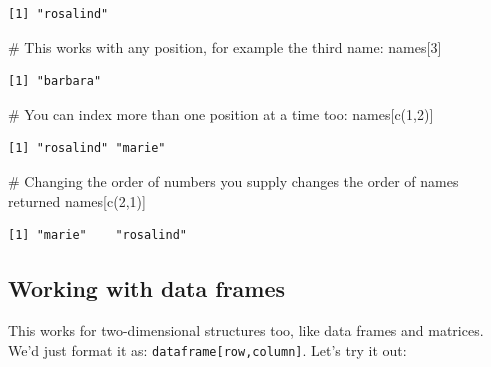 \documentclass[
  letterpaper,
  DIV=11,
  numbers=noendperiod]{scrreprt}
\newenvironment{Shaded}{\begin{snugshade}}{\end{snugshade}}
\newcommand{\CommentTok}[1]{\textcolor[rgb]{0.37,0.37,0.37}{#1}}
\newcommand{\DecValTok}[1]{\textcolor[rgb]{0.68,0.00,0.00}{#1}}
\newcommand{\FunctionTok}[1]{\textcolor[rgb]{0.28,0.35,0.67}{#1}}
\newcommand{\NormalTok}[1]{\textcolor[rgb]{0.00,0.23,0.31}{#1}}
\begin{document}
\begin{verbatim}
[1] "rosalind"
\end{verbatim}

\begin{Shaded}
\begin{Highlighting}[]
\CommentTok{\# This works with any position, for example the third name:}
\NormalTok{names[}\DecValTok{3}\NormalTok{]}
\end{Highlighting}
\end{Shaded}

\begin{verbatim}
[1] "barbara"
\end{verbatim}

\begin{Shaded}
\begin{Highlighting}[]
\CommentTok{\# You can index more than one position at a time too:}
\NormalTok{names[}\FunctionTok{c}\NormalTok{(}\DecValTok{1}\NormalTok{,}\DecValTok{2}\NormalTok{)]}
\end{Highlighting}
\end{Shaded}

\begin{verbatim}
[1] "rosalind" "marie"   
\end{verbatim}

\begin{Shaded}
\begin{Highlighting}[]
\CommentTok{\# Changing the order of numbers you supply changes the order of names returned}
\NormalTok{names[}\FunctionTok{c}\NormalTok{(}\DecValTok{2}\NormalTok{,}\DecValTok{1}\NormalTok{)]}
\end{Highlighting}
\end{Shaded}

\begin{verbatim}
[1] "marie"    "rosalind"
\end{verbatim}

\hypertarget{working-with-data-frames}{%
\subsection{Working with data frames}\label{working-with-data-frames}}

This works for two-dimensional structures too, like data frames and
matrices. We'd just format it as: \texttt{dataframe{[}row,column{]}}.
Let's try it out:
\end{document}
